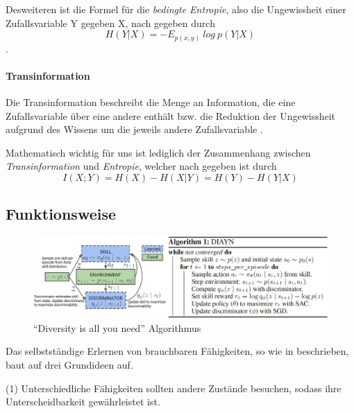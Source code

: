 Desweiteren ist die Formel für die \textit{bedingte Entropie}, also die Ungewissheit einer Zufallsvariable Y gegeben X, nach \cite{elements_cover} gegeben durch
\begin{equation}
    H(Y|X) = - E_{p(x,y)}\ log\ p(Y|X) \label{eq:condit_entropy}
\end{equation}
.

\paragraph{Transinformation}

Die Transinformation beschreibt die Menge an Information, die eine Zufallsvariable über eine andere enthält bzw. die Reduktion der Ungewissheit aufgrund des Wissens um die jeweils andere Zufallsvariable \cite{elements_cover}.

Mathematisch wichtig für uns ist lediglich der Zusammenhang zwischen \textit{Transinformation} und \textit{Entropie}, welcher nach \cite{elements_cover} gegeben ist durch
\begin{equation}
    I(X;Y) = H(X) - H(X|Y) = H(Y) - H(Y|X) \label{eq:trans_ent}
\end{equation}

\subsection{Funktionsweise}
\label{sec:diversity_howitworks}
\begin{figure}[h]
\includegraphics[width=\textwidth, keepaspectratio=true]{images/algorithm_diayn.JPG}
\caption{``Diversity is all you need'' Algorithmus} \label{img:diayn}
\end{figure}
Das selbstständige Erlernen von brauchbaren Fähigkeiten, so wie in \cite{diversity_eysenbach} beschrieben, baut auf drei Grundideen auf.

\smallspace

(1) Unterschiedliche Fähigkeiten sollten andere Zustände besuchen, sodass ihre Unterscheidbarkeit gewährleistet ist.

